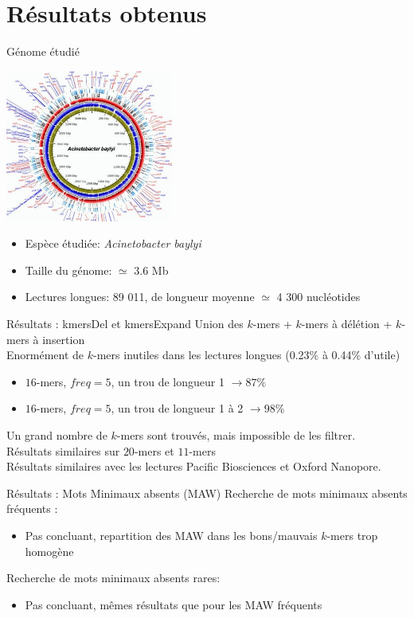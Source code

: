 \documentclass[11pt]{beamer}
\begin{document}
\section{Résultats obtenus}
\begin{frame}[fragile]{Génome étudié}
  \begin{center}
    \includegraphics[height=50mm]{acineto}
  \end{center}
  \begin{itemize}[<+-| alert@+>]
    \item Espèce étudiée: \textit{Acinetobacter baylyi}
    \item Taille du génome: $\simeq$ 3.6 Mb
    \item Lectures longues: 89 011, de longueur moyenne $\simeq$ 4 300 nucléotides
  \end{itemize}
\end{frame}
\begin{frame}[fragile]{Résultats : kmersDel et kmersExpand}
  Union des $\textit{k}$-mers + $\textit{k}$-mers à délétion + $\textit{k}$-mers à insertion\medskip\\\pause
  Enormément de $k$-mers inutiles dans les lectures longues (0.23\% à 0.44\% d'utile)\pause
  \begin{itemize}[<+-| alert@+>]
    \item $16$-mers, $freq = 5$, un trou de longueur 1 $\rightarrow 87\%$
    \item $16$-mers, $freq = 5$, un trou de longueur 1 à 2 $\rightarrow 98\%$
  \end{itemize}
  \pause
  Un grand nombre de $\textit{k}$-mers sont trouvés, mais impossible de les filtrer.\medskip\pause\\
  Résultats similaires sur $20$-mers et $11$-mers\medskip\pause\\
  Résultats similaires avec les lectures Pacific Biosciences et Oxford Nanopore.
\end{frame}

\begin{frame}[fragile]{Résultats : Mots Minimaux absents (MAW)}
  Recherche de mots minimaux absents fréquents :\pause
  \begin{itemize}
    \item Pas concluant, repartition des MAW dans les bons/mauvais $k$-mers trop homogène
  \end{itemize}\pause
  Recherche de mots minimaux absents rares:\pause
  \begin{itemize}
    \item Pas concluant, mêmes résultats que pour les MAW fréquents
  \end{itemize}
\end{frame}
\end{document}
